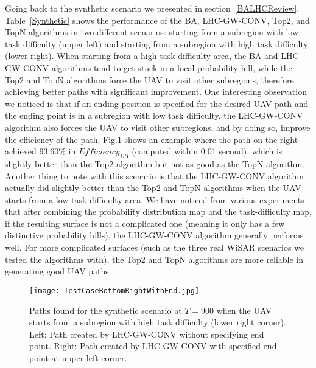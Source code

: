 \documentclass[journal]{IEEEtran}
\begin{document}
Going back to the synthetic scenario we presented in section~\ref{BALHCReview}, Table~\ref{Synthetic} shows the performance of the BA, LHC-GW-CONV, Top2, and TopN algorithms in two different scenarios: starting from a subregion with low task difficulty (upper left) and starting from a subregion with high task difficulty (lower right). When starting from a high task difficulty area, the BA and LHC-GW-CONV algorithms tend to get stuck in a local probability hill, while the Top2 and TopN algorithms force the UAV to visit other subregions, therefore achieving better paths with significant improvement. One interesting observation we noticed is that if an ending position is specified for the desired UAV path and the ending point is in a subregion with low task difficulty, the LHC-GW-CONV algorithm also forces the UAV to visit other subregions, and by doing so, improve the efficiency of the path. Fig.\ref{SyntheticCasePaths3} shows an example where the path on the right achieved 93.60\% in $\mathit{Efficiency_{LB}}$ (computed within 0.01 second), which is slightly better than the Top2 algorithm but not as good as the TopN algorithm. Another thing to note with this scenario is that the LHC-GW-CONV algorithm actually did slightly better than the Top2 and TopN algorithms when the UAV starts from a low task difficulty area. We have noticed from various experiments that after combining the probability distribution map and the task-difficulty map, if the resulting surface is not a complicated one (meaning it only has a few distinctive probability hills), the LHC-GW-CONV algorithm generally performs well. For more complicated surfaces (such as the three real WiSAR scenarios we tested the algorithms with), the Top2 and TopN algorithms are more reliable in generating good UAV paths. 


\begin{figure}
\centering
\texttt{[image: TestCaseBottomRightWithEnd.jpg]}
\caption{Paths found for the synthetic scenario at $T=900$ when the UAV starts from a subregion with high task difficulty (lower right corner). Left: Path created by LHC-GW-CONV without specifying end point. Right: Path created by LHC-GW-CONV with specified end point at upper left corner.}
\label{SyntheticCasePaths3}
\end{figure}
\end{document}
